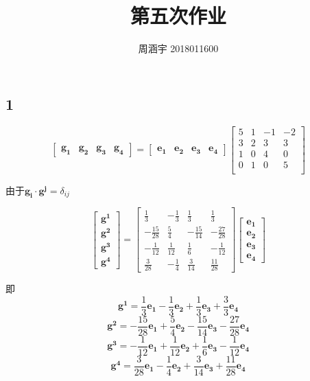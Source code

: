 \documentclass[UTF8,zihao=5]{ctexart}
\title{{\bfseries 第五次作业}}
\author{周涵宇 2018011600}
\date{}
\begin{document}
\maketitle

\subsection*{1}

\begin{equation*}
    \begin{bmatrix}
        \bm{g_1}&\bm{g_2}&\bm{g_3}&\bm{g_4}
    \end{bmatrix}
    =
    \begin{bmatrix}
        \bm{e_1}&\bm{e_2}&\bm{e_3}&\bm{e_4}
    \end{bmatrix}
    \begin{bmatrix}
        5&1&-1&-2\\
        3&2& 3& 3\\
        1&0& 4& 0\\
        0&1& 0& 5\\
    \end{bmatrix}   
\end{equation*}

由于$\bm{g_i\cdot g^j}=\delta_{ij}$

\begin{equation*}
    \begin{bmatrix}
        \bm{g^1}\\\bm{g^2}\\\bm{g^3}\\\bm{g^4}
    \end{bmatrix}
    =
    \left[\begin{array}{cccc} \frac{1}{3} & -\frac{1}{3} & \frac{1}{3} & \frac{1}{3}\\ -\frac{15}{28} & \frac{5}{4} & -\frac{15}{14} & -\frac{27}{28}\\ -\frac{1}{12} & \frac{1}{12} & \frac{1}{6} & -\frac{1}{12}\\ \frac{3}{28} & -\frac{1}{4} & \frac{3}{14} & \frac{11}{28} \end{array}\right]
    \begin{bmatrix}
        \bm{e_1}\\\bm{e_2}\\\bm{e_3}\\\bm{e_4}
    \end{bmatrix}
\end{equation*}

即
$$
\bm{g^1}=
 \frac{1}{3}\bm{e_1}
-\frac{1}{3}\bm{e_2}
+\frac{1}{3}\bm{e_3}
+\frac{3}{3}\bm{e_4}
$$
$$
\bm{g^2}=
-\frac{15}{28}\bm{e_1}
+\frac{5}{4}\bm{e_2}
-\frac{15}{14}\bm{e_3}
-\frac{27}{28}\bm{e_4}
$$
$$
\bm{g^3}=
-\frac{1}{12}\bm{e_1}
+\frac{1}{12}\bm{e_2}
+\frac{1}{6}\bm{e_3}
-\frac{1}{12}\bm{e_4}
$$
$$
\bm{g^4}=
 \frac{3}{28}\bm{e_1}
-\frac{1}{4}\bm{e_2}
+\frac{3}{14}\bm{e_3}
+\frac{11}{28}\bm{e_4}
$$
\end{document}
